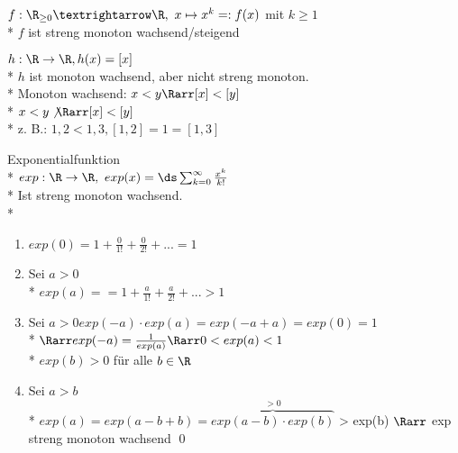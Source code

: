 \begin{enumerate}
\item{$f:\R_{\geq 0}→\R,\ x\mapsto x^k =:f(x)$ mit $k\geq 1$\\*%
$f$ ist streng monoton wachsend/steigend 
\item{$h: \R \to \R, h(x) = [x]$}\\*
$h$ ist monoton wachsend, aber nicht streng monoton.\\*
Monoton wachsend: $x < y \Rarr [x] < [y]$\\*
$x < y \not\Rarr [x] < [y]$\\*
z. B.: $1,2 < 1,3 , [1,2] = 1 = [1,3] $}
\item{Exponentialfunktion\\*
$exp: \R \to \R,\ exp(x)= \ds\sum_{k=0}^{\infty} \frac{x^k}{k!}$\\*
Ist streng monoton wachsend.\\*
\bew
\begin{enumerate}
\item{$exp(0) = 1 + \frac{0}{1!} + \frac{0}{2!} + ... = 1$}
\item{Sei $a > 0$\\*
$exp(a) = = 1 + \frac{a}{1!} + \frac{a}{2!} + ... > 1$}
\item{Sei $a > 0 exp(-a) \cdot exp(a) = exp(-a + a) = exp(0) = 1$\\*
$\Rarr exp(-a) = \frac{1}{exp(a)} \Rarr 0 < exp(a) < 1$\\*
$exp(b) > 0$ für alle $b \in \R$}
\item{Sei $a > b$\\*
$exp(a) = exp(a - b + b) = \overbrace{exp(a - b) \cdot exp(b)}^{>0}$
> exp(b) $\Rarr$ exp streng monoton wachsend \qed }
\end{enumerate}
}
\end{enumerate}
%
